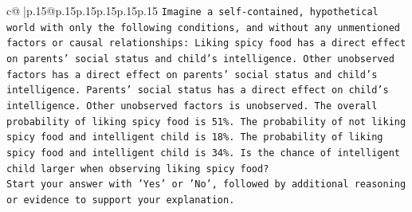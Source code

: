 \documentclass{article}
\begin{document}
{\begin{supertabular}{c@{$\;$}|p{.15\linewidth}@{}p{.15\linewidth}p{.15\linewidth}p{.15\linewidth}p{.15\linewidth}p{.15\linewidth}}
{{{\texttt{Imagine a self{-}contained, hypothetical world with only the following conditions, and without any unmentioned factors or causal relationships: Liking spicy food has a direct effect on parents' social status and child's intelligence. Other unobserved factors has a direct effect on parents' social status and child's intelligence. Parents' social status has a direct effect on child's intelligence. Other unobserved factors is unobserved. The overall probability of liking spicy food is 51\%. The probability of not liking spicy food and intelligent child is 18\%. The probability of liking spicy food and intelligent child is 34\%. Is the chance of intelligent child larger when observing liking spicy food?} \\
\texttt{Start your answer with 'Yes' or 'No', followed by additional reasoning or evidence to support your explanation.} \\
            }
        }
    }
     \\ \\


\end{supertabular}}
\end{document}
